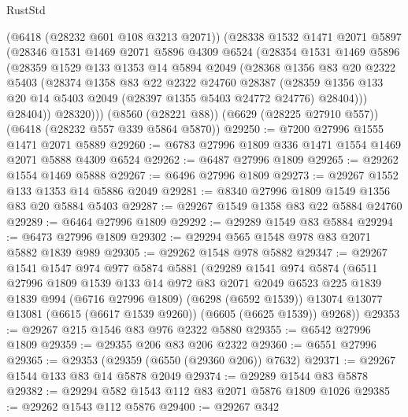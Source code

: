 \begin{lexlean}{RustStd}
\begin{coremodule}
      (@6418 (@28232 @601 @108 @3213 @2071))
      (@28338
        @1532
        @1471
        @2071
        @5897
        (@28346
          @1531
          @1469
          @2071
          @5896
          @4309
          @6524
          (@28354
            @1531
            @1469
            @5896
            (@28359
              @1529
              @133
              @1353
              @14
              @5894
              @2049
              (@28368
                @1356
                @83
                @20
                @2322
                @5403
                (@28374
                  @1358
                  @83
                  @22
                  @2322
                  @24760
                  @28387
                  (@28359
                    @1356
                    @133
                    @20
                    @14
                    @5403
                    @2049
                    (@28397 @1355 @5403 @24772 @24776)
                    @28404)))
              @28404))
          @28320)))
    (@8560 (@28221 @88))
    (@6629 (@28225 @27910 @557))
    (@6418 (@28232 @557 @339 @5864 @5870))
@29250 := @7200 @27996 @1555 @1471 @2071 @5889
@29260 := @6783 @27996 @1809 @336 @1471 @1554 @1469 @2071 @5888 @4309 @6524
@29262 := @6487 @27996 @1809
@29265 := @29262 @1554 @1469 @5888
@29267 := @6496 @27996 @1809
@29273 := @29267 @1552 @133 @1353 @14 @5886 @2049
@29281 := @8340 @27996 @1809 @1549 @1356 @83 @20 @5884 @5403
@29287 := @29267 @1549 @1358 @83 @22 @5884 @24760
@29289 := @6464 @27996 @1809
@29292 := @29289 @1549 @83 @5884
@29294 := @6473 @27996 @1809
@29302 := @29294 @565 @1548 @978 @83 @2071 @5882 @1839 @989
@29305 := @29262 @1548 @978 @5882
@29347 := @29267
    @1541
    @1547
    @974
    @977
    @5874
    @5881
    (@29289
      @1541
      @974
      @5874
      (@6511
        @27996
        @1809
        @1539
        @133
        @14
        @972
        @83
        @2071
        @2049
        @6523
        @225
        @1839
        @1839
        @994
        (@6716 @27996 @1809)
        (@6298 (@6592 @1539))
        @13074
        @13077
        @13081
        (@6615 (@6617 @1539 @9260))
        (@6605 (@6625 @1539))
        @9268))
@29353 := @29267 @215 @1546 @83 @976 @2322 @5880
@29355 := @6542 @27996 @1809
@29359 := @29355 @206 @83 @206 @2322
@29360 := @6551 @27996
@29365 := @29353 (@29359 (@6550 (@29360 @206)) @7632)
@29371 := @29267 @1544 @133 @83 @14 @5878 @2049
@29374 := @29289 @1544 @83 @5878
@29382 := @29294 @582 @1543 @112 @83 @2071 @5876 @1809 @1026
@29385 := @29262 @1543 @112 @5876
@29400 := @29267
    @342

\end{coremodule}
\end{lexlean}
